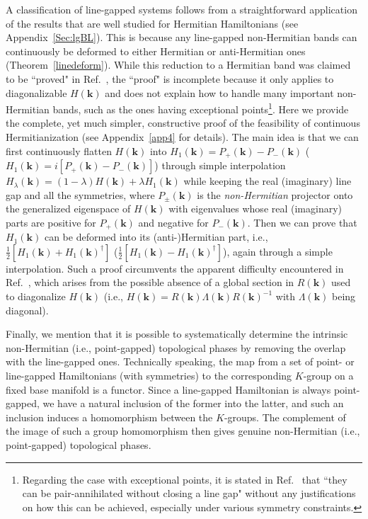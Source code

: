 \documentclass{tADP2e}
\theoremstyle{plain}
\theoremstyle{plain}
\theoremstyle{definition}
\begin{document}
A classification of line-gapped systems follows from a straightforward application of the results that are well studied for Hermitian Hamiltonians (see Appendix~\ref{Sec:lgBL}).
This is because any line-gapped non-Hermitian bands can continuously be deformed to either Hermitian or anti-Hermitian ones (Theorem~\ref{linedeform}). While this reduction to a Hermitian band was claimed to be ``proved" in Ref.~\cite{KK19c}, the ``proof" is incomplete because it only applies to diagonalizable $H(\boldsymbol{k})$ 
and does not explain how to handle many important non-Hermitian bands, such as the ones having exceptional points\footnote{Regarding the case with exceptional points, it is stated in Ref.~\cite{KK19c} that ``they can be pair-annihilated without closing a line gap" without any justifications on how this can be achieved, especially under various symmetry constraints.}. 
Here we provide the complete, yet much simpler, constructive proof of the feasibility of continuous Hermitianization (see Appendix~\ref{app4} for details). The main idea is that we can first continuously flatten 
$H(\boldsymbol{k})$ into $H_1(\boldsymbol{k})=P_+(\boldsymbol{k})-P_-(\boldsymbol{k})$ ($H_1(\boldsymbol{k})=i[P_+(\boldsymbol{k})-P_-(\boldsymbol{k})]$) through simple interpolation $H_\lambda(\boldsymbol{k})=(1-\lambda) H(\boldsymbol{k}) + \lambda H_1(\boldsymbol{k})$ while keeping the real (imaginary) line gap and all the symmetries, where $P_\pm(\boldsymbol{k})$ is the \emph{non-Hermitian} projector onto the generalized eigenspace of $H(\boldsymbol{k})$ with eigenvalues whose real  (imaginary) parts are positive for $P_{+}(\boldsymbol{k})$ and negative for $P_{-}(\boldsymbol{k})$. Then we can prove that $H_1(\boldsymbol{k})$ can be deformed into its (anti-)Hermitian part, i.e., $\frac{1}{2}[H_1(\boldsymbol{k})+H_1(\boldsymbol{k})^\dag]$ ($\frac{1}{2}[H_1(\boldsymbol{k})-H_1(\boldsymbol{k})^\dag]$), again through a simple interpolation. Such a proof circumvents the apparent difficulty encountered in Ref.~\cite{KK19c}, which arises from the possible absence of a global section in $R(\boldsymbol{k})$ used to diagonalize $H(\boldsymbol{k})$ (i.e., $H(\boldsymbol{k})=R(\boldsymbol{k})\Lambda(\boldsymbol{k})R(\boldsymbol{k})^{-1}$ with $\Lambda(\boldsymbol{k})$ being diagonal).


Finally, we mention that it is possible to systematically determine the intrinsic non-Hermitian (i.e., point-gapped)  topological phases by removing the overlap with the line-gapped ones. %
Technically speaking, the map from a set of point- or line-gapped Hamiltonians (with symmetries) to the corresponding $K$-group on a fixed base manifold is a functor. Since a line-gapped Hamiltonian is always point-gapped, we have a natural inclusion of the former into the latter, and such an inclusion induces a homomorphism between the $K$-groups. The complement of the image of such a group homomorphism then gives genuine non-Hermitian (i.e., point-gapped)  topological phases. 
\end{document}
